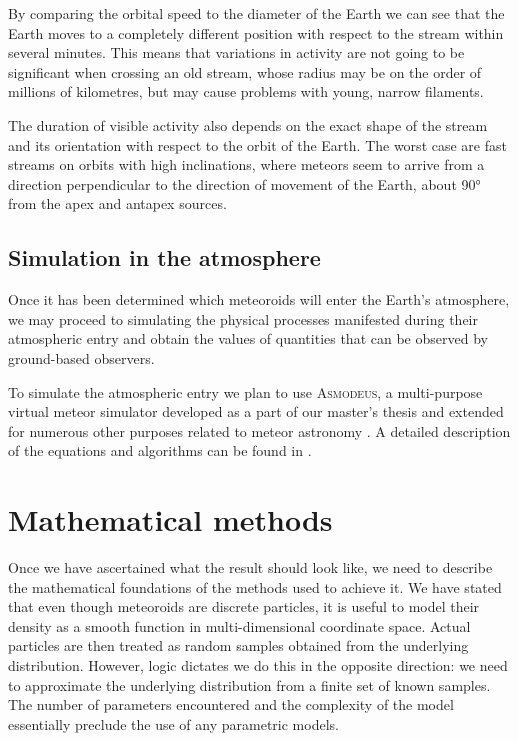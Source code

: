         By comparing the orbital speed to the diameter of the Earth we can see that the Earth moves
        to a completely different position with respect to the stream within several minutes.
        This means that variations in activity are not going to be significant when crossing an old stream,
        whose radius may be on the order of millions of kilometres, but may cause problems with young, narrow filaments.

        The duration of visible activity also depends on the exact shape of the stream and its orientation with respect to the orbit of the Earth.
        The worst case are fast streams on orbits with high inclinations, where meteors seem to arrive
        from a direction perpendicular to the direction of movement of the Earth, about \ang{90} from the apex and antapex sources.

    \subsection{Simulation in the atmosphere} \label{mia}
        Once it has been determined which meteoroids will enter the Earth's atmosphere, we may proceed to simulating
        the physical processes manifested during their atmospheric entry and obtain the values of quantities
        that can be observed by ground-based observers.

        To simulate the atmospheric entry we plan to use \textsc{Asmodeus},
        a multi-purpose virtual meteor simulator developed as a part of our master's thesis and extended for numerous
        other purposes related to meteor astronomy \citep{balaz-thesis}. A detailed description
        of the equations and algorithms can be found in \citep{balaz+2020}.

\section{Mathematical methods} \label{mm}
    Once we have ascertained what the result should look like, we need to describe the mathematical foundations of the methods used to achieve it.
    We have stated that even though meteoroids are discrete particles, it is useful to model their density
    as a smooth function in multi-dimensional coordinate space.
    Actual particles are then treated as random samples obtained from the underlying distribution.
    However, logic dictates we do this in the opposite direction: we need to approximate
    the underlying distribution from a finite set of known samples.
    The number of parameters encountered and the complexity of the model essentially preclude the use of any parametric models.

